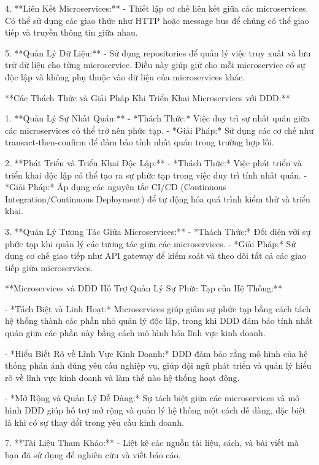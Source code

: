 4. **Liên Kết Microservices:**
   - Thiết lập cơ chế liên kết giữa các microservices. Có thể sử dụng các giao thức như HTTP hoặc message bus để chúng có thể giao tiếp và truyền thông tin giữa nhau.

5. **Quản Lý Dữ Liệu:**
   - Sử dụng repositories để quản lý việc truy xuất và lưu trữ dữ liệu cho từng microservice. Điều này giúp giữ cho mỗi microservice có sự độc lập và không phụ thuộc vào dữ liệu của microservices khác.

**Các Thách Thức và Giải Pháp Khi Triển Khai Microservices với DDD:**

1. **Quản Lý Sự Nhất Quán:**
   - *Thách Thức:* Việc duy trì sự nhất quán giữa các microservices có thể trở nên phức tạp.
   - *Giải Pháp:* Sử dụng các cơ chế như transact-then-confirm để đảm bảo tính nhất quán trong trường hợp lỗi.

2. **Phát Triển và Triển Khai Độc Lập:**
   - *Thách Thức:* Việc phát triển và triển khai độc lập có thể tạo ra sự phức tạp trong việc duy trì tính nhất quán.
   - *Giải Pháp:* Áp dụng các nguyên tắc CI/CD (Continuous Integration/Continuous Deployment) để tự động hóa quá trình kiểm thử và triển khai.

3. **Quản Lý Tương Tác Giữa Microservices:**
   - *Thách Thức:* Đối diện với sự phức tạp khi quản lý các tương tác giữa các microservices.
   - *Giải Pháp:* Sử dụng cơ chế giao tiếp như API gateway để kiểm soát và theo dõi tất cả các giao tiếp giữa microservices.

**Microservices và DDD Hỗ Trợ Quản Lý Sự Phức Tạp của Hệ Thống:**

- *Tách Biệt và Linh Hoạt:* Microservices giúp giảm sự phức tạp bằng cách tách hệ thống thành các phần nhỏ quản lý độc lập, trong khi DDD đảm bảo tính nhất quán giữa các phần này bằng cách mô hình hóa lĩnh vực kinh doanh.

- *Hiểu Biết Rõ về Lĩnh Vực Kinh Doanh:* DDD đảm bảo rằng mô hình của hệ thống phản ánh đúng yêu cầu nghiệp vụ, giúp đội ngũ phát triển và quản lý hiểu rõ về lĩnh vực kinh doanh và làm thế nào hệ thống hoạt động.

- *Mở Rộng và Quản Lý Dễ Dàng:* Sự tách biệt giữa các microservices và mô hình DDD giúp hỗ trợ mở rộng và quản lý hệ thống một cách dễ dàng, đặc biệt là khi có sự thay đổi trong yêu cầu kinh doanh.




7. **Tài Liệu Tham Khảo:**
   - Liệt kê các nguồn tài liệu, sách, và bài viết mà bạn đã sử dụng để nghiên cứu và viết báo cáo.
 


